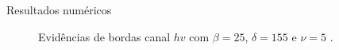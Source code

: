 \documentclass[10pt]{beamer}
\begin{document}
\begin{frame}{Resultados numéricos}
\begin{figure}[hbt]
	\caption{Evidências de bordas canal $hv$ com $\beta = 25$, $\delta = 155$ e $\nu = 5$ .}
\label{cap_acf_fig16}
\endminipage\hfill
\end{figure}
\end{frame}
\end{document}

